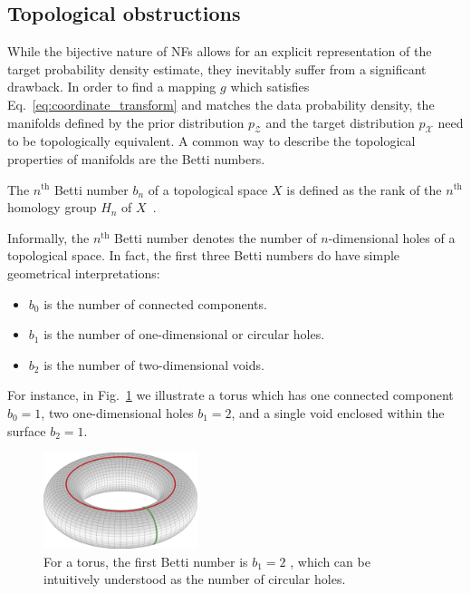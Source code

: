 \subsection{Topological obstructions}
\label{sec:topology}

While the bijective nature of NFs allows for an explicit representation of the target probability density estimate, they inevitably suffer from a significant drawback.
In order to find a mapping $g$ which satisfies Eq.~\eqref{eq:coordinate_transform} and matches the data probability density, the manifolds defined by the prior distribution $p_\mathcal{Z}$ and the target distribution $p_\mathcal{X}$ need to be topologically equivalent.
A common way to describe the topological properties of manifolds are the Betti numbers.
%
\begin{definition}
The $n^\text{th}$ Betti number $b_n$ of a topological space $X$ is defined as the rank of the $n^\text{th}$ homology group $H_n$ of $X$~\cite{bettinumbers,hatcher2002algebraic}.
\end{definition}
%
Informally, the $n^\text{th}$ Betti number denotes the number of $n$-dimensional holes of a topological space.
In fact, the first three Betti numbers do have simple geometrical interpretations:
\begin{itemize}
    \item $b_0$ is the number of connected components.
    \item $b_1$ is the number of one-dimensional or circular holes.
    \item $b_2$ is the number of two-dimensional voids.
\end{itemize}
For instance, in Fig.~\ref{fig:betti_torus} we illustrate a torus which has one connected component $b_0 =1$, two one-dimensional holes $b_1 = 2$, and a single void enclosed within the surface $b_2 = 1$.
%
\begin{figure}[!htbp]
    \centering
    \includegraphics[width=0.4\textwidth]{./figures/LSR/torus.png}
    \caption{For a torus, the first Betti number is $b_1 = 2$ , which can be intuitively understood as the number of circular holes.}
    \label{fig:betti_torus}
\end{figure}

